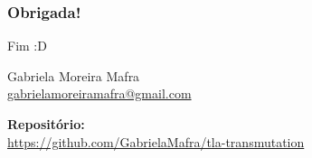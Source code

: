 \documentclass{beamer}
\begin{document}
\begin{frame}
  \frametitle{Obrigada!}

  {\Huge Fim :D}\bigskip

  Gabriela Moreira Mafra\\\smallskip
  {\url{gabrielamoreiramafra@gmail.com}}\\\bigskip

  \textbf{Repositório:}\\
  {\url{https://github.com/GabrielaMafra/tla-transmutation}}

\end{frame}
\end{document}
